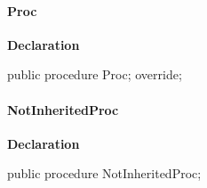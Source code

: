 \documentclass{report}
\newif\ifpdf
\begin{document}
\paragraph*{Proc}\hspace*{\fill}

\label{ok_inherited_descriptions.TClassD-Proc}
\begin{list}{}{
\setlength{\itemindent}{0cm}
\setlength{\listparindent}{0cm}
\setlength{\leftmargin}{\evensidemargin}
\addtolength{\leftmargin}{\tmplength}
\settowidth{\labelsep}{X}
\addtolength{\leftmargin}{\labelsep}
\setlength{\labelwidth}{\tmplength}
}
\item[\textbf{Declaration}\hfill]
\ifpdf
\begin{flushleft}
\fi
\begin{ttfamily}
public procedure Proc; override;\end{ttfamily}

\ifpdf
\end{flushleft}
\fi

\end{list}
\paragraph*{NotInheritedProc}\hspace*{\fill}

\label{ok_inherited_descriptions.TClassD-NotInheritedProc}
\begin{list}{}{
\setlength{\itemindent}{0cm}
\setlength{\listparindent}{0cm}
\setlength{\leftmargin}{\evensidemargin}
\addtolength{\leftmargin}{\tmplength}
\settowidth{\labelsep}{X}
\addtolength{\leftmargin}{\labelsep}
\setlength{\labelwidth}{\tmplength}
}
\item[\textbf{Declaration}\hfill]
\ifpdf
\begin{flushleft}
\fi
\begin{ttfamily}
public procedure NotInheritedProc;\end{ttfamily}

\ifpdf
\end{flushleft}
\fi

\end{list}
\end{document}
